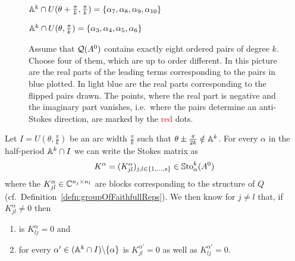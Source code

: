 \begin{figure}[h!]
\begin{center}
\begin{tikzpicture}[scale=4]

    \end{tikzpicture}
  \end{center}
  \begin{flushright}
    $\A^k\cap U(\theta+\frac{\pi}{k},\frac{\pi}{k})=\{\alpha_7,\alpha_8,\alpha_9,\alpha_{10}\}$
  \end{flushright}
  \begin{flushright}
    $\A^k\cap U(\theta,\frac{\pi}{k})=\{\alpha_3,\alpha_4,\alpha_5,\alpha_6\}$
  \end{flushright}
  \caption{Assume that $\cQ(A^0)$ contains exactly eight ordered pairs of degree
    $k$. Choose four of them, which are up to order different. In this picture
    are the real parts of the leading terms corresponding to the pairs in
    \textcolor{blue!40!black}{blue} plotted. In \textcolor{blue!60!white}{light
      blue} are the real parts corresponding to the flipped pairs drawn. The
    points, where the real part is negative and the imaginary part vanishes,
    i.e.\ where the pairs determine an anti-Stokes direction, are marked by the
    \textcolor{red}{red} dots.}\label{fig:halfPeriod}
\end{figure} %
\begin{prop}\label{prop:propAboutCommonStructure}
  Let $I=U(\theta,\frac{\pi}{k})$ be an arc width $\frac{\pi}{k}$ such that
  $\theta\pm\frac{\pi}{2k}\notin\A^k$.
  For every $\alpha$ in the half-period $\A^k\cap I$ we can write the Stokes
  matrix as
  \[
    K^\alpha=(K^\alpha_{jl})_{j,l\in\{1,\dots,s\}}\in\SSto_\alpha^k(A^0)
  \]
  where the $K^\alpha_{jl}\in\C^{n_j\times n_l}$ are blocks corresponding to
  the structure of $Q$ (cf.\ Definition~\ref{defn:groupOfFaithfullReps}).
  We then know for $j\neq l$ that, if $K^\alpha_{jl}\neq0$ then
  \begin{enumerate}
  \item is $K^\alpha_{lj}=0$ and
  \item for every $\alpha'\in(\A^k\cap I)\backslash\{\alpha\}$ is
    $K^{\alpha'}_{jl}=0$ as well as $K^{\alpha'}_{lj}=0$.
  \end{enumerate}
\end{prop}
